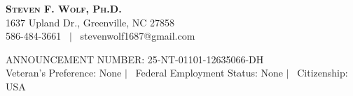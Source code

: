 \documentclass[letterpaper,12pt]{fed-res} %
\begin{document}
\begin{center}
    \textbf{\Huge \scshape Steven F. Wolf, Ph.D.} \\ \vspace{1pt}
    1637 Upland Dr., Greenville, NC 27858 \\ \vspace{1pt}
    586-484-3661 \ $|$ \ stevenwolf1687@gmail.com \\ \vspace{1pt} %
\end{center}

ANNOUNCEMENT NUMBER: 25-NT-01101-12635066-DH \\ \vspace{1pt} %
Veteran's Preference: None $|$ \ Federal Employment Status: None $|$ \ Citizenship: USA %








%
\end{document}
